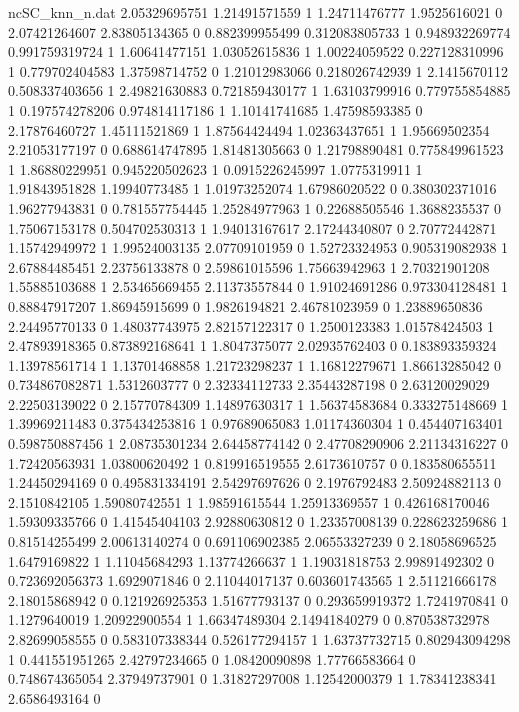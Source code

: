 \begin{filecontents}{ncSC_knn_n.dat}
2.05329695751 1.21491571559 1
1.24711476777 1.9525616021 0
2.07421264607 2.83805134365 0
0.882399955499 0.312083805733 1
0.948932269774 0.991759319724 1
1.60641477151 1.03052615836 1
1.00224059522 0.227128310996 1
0.779702404583 1.37598714752 0
1.21012983066 0.218026742939 1
2.1415670112 0.508337403656 1
2.49821630883 0.721859430177 1
1.63103799916 0.779755854885 1
0.197574278206 0.974814117186 1
1.10141741685 1.47598593385 0
2.17876460727 1.45111521869 1
1.87564424494 1.02363437651 1
1.95669502354 2.21053177197 0
0.688614747895 1.81481305663 0
1.21798890481 0.775849961523 1
1.86880229951 0.945220502623 1
0.0915226245997 1.0775319911 1
1.91843951828 1.19940773485 1
1.01973252074 1.67986020522 0
0.380302371016 1.96277943831 0
0.781557754445 1.25284977963 1
0.22688505546 1.3688235537 0
1.75067153178 0.504702530313 1
1.94013167617 2.17244340807 0
2.70772442871 1.15742949972 1
1.99524003135 2.07709101959 0
1.52723324953 0.905319082938 1
2.67884485451 2.23756133878 0
2.59861015596 1.75663942963 1
2.70321901208 1.55885103688 1
2.53465669455 2.11373557844 0
1.91024691286 0.973304128481 1
0.88847917207 1.86945915699 0
1.9826194821 2.46781023959 0
1.23889650836 2.24495770133 0
1.48037743975 2.82157122317 0
1.2500123383 1.01578424503 1
2.47893918365 0.873892168641 1
1.8047375077 2.02935762403 0
0.183893359324 1.13978561714 1
1.13701468858 1.21723298237 1
1.16812279671 1.86613285042 0
0.734867082871 1.5312603777 0
2.32334112733 2.35443287198 0
2.63120029029 2.22503139022 0
2.15770784309 1.14897630317 1
1.56374583684 0.333275148669 1
1.39969211483 0.375434253816 1
0.97689065083 1.01174360304 1
0.454407163401 0.598750887456 1
2.08735301234 2.64458774142 0
2.47708290906 2.21134316227 0
1.72420563931 1.03800620492 1
0.819916519555 2.6173610757 0
0.183580655511 1.24450294169 0
0.495831334191 2.54297697626 0
2.1976792483 2.50924882113 0
2.1510842105 1.59080742551 1
1.98591615544 1.25913369557 1
0.426168170046 1.59309335766 0
1.41545404103 2.92880630812 0
1.23357008139 0.228623259686 1
0.81514255499 2.00613140274 0
0.691106902385 2.06553327239 0
2.18058696525 1.6479169822 1
1.11045684293 1.13774266637 1
1.19031818753 2.99891492302 0
0.723692056373 1.6929071846 0
2.11044017137 0.603601743565 1
2.51121666178 2.18015868942 0
0.121926925353 1.51677793137 0
0.293659919372 1.7241970841 0
1.1279640019 1.20922900554 1
1.66347489304 2.14941840279 0
0.870538732978 2.82699058555 0
0.583107338344 0.526177294157 1
1.63737732715 0.802943094298 1
0.441551951265 2.42797234665 0
1.08420090898 1.77766583664 0
0.748674365054 2.37949737901 0
1.31827297008 1.12542000379 1
1.78341238341 2.6586493164 0

\end{filecontents}
